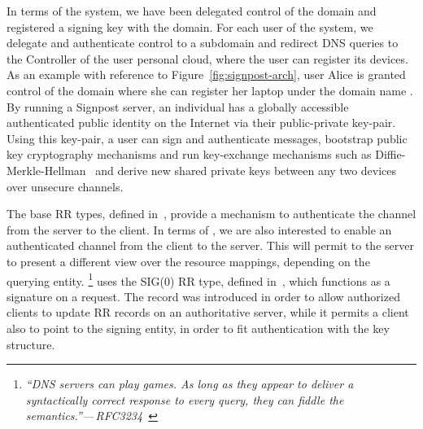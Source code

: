In terms of the \signpost system, we have been delegated control of the \fqsn{ }
domain and registered a signing key with the  domain.  For each user
of the \signpost system, we delegate and authenticate control to a subdomain and
redirect DNS queries to the \signpost Controller of the user personal cloud,
where the user can register its devices. As an example with reference to
Figure~\ref{fig:signpost-arch}, user Alice is granted control of the domain
 where she can register her laptop under the domain name
.  By running a Signpost server, an individual has a globally
accessible authenticated public identity on the Internet via their
public-private key-pair. Using this key-pair, a user can sign and authenticate
messages, bootstrap public key cryptography mechanisms and run key-exchange
mechanisms such as Diffie-Merkle-Hellman~\cite{diffie,RFC2631} and derive new
shared private keys between any two devices over unsecure channels.

The base \dnssec RR types, defined in~\cite{RFC4034}, provide a mechanism to
authenticate the channel from the server to the client. In terms of \signpost,
we are also interested to enable an authenticated channel from the client to the
server. This will permit to the server to present a different view over the
resource mappings, depending on the querying entity.  \footnote{{\em ``DNS
    servers can play games. As long as they appear to deliver a syntactically
    correct response to every query, they can fiddle the
    semantics.''---\,RFC3234~\cite{RFC3234}}} \signpost uses the SIG(0) RR type,
defined in~\cite{RFC2931}, which functions as a signature on a request. The
record was introduced in order to allow authorized clients to update RR records
on an authoritative server, while it permits a client also to point to the
signing entity, in order to fit authentication with the \dnssec key structure. 


